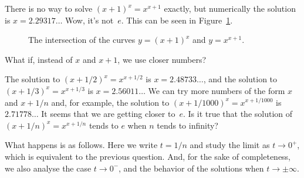 \documentclass[11pt, a4paper]{article}
\begin{document}
There is no way to solve $(x+1)^x = x^{x+1}$ exactly, but numerically the solution is $x = 2.29317\dots$ Wow, it's not~$e$.
This can be seen in Figure~\ref{fig1}.
\begin{figure}[ht]
\centering
{}
\caption{The intersection of the curves $y=(x+1)^{x}$ and $y=x^{x+1}$.}
\label{fig1}
\end{figure}

What if, instead of $x$ and $x+1$, we use closer numbers?

The solution to $(x+1/2)^x = x^{x+1/2}$ is $x = 2.48733\dots$,
and the solution to $(x+1/3)^x = x^{x+1/3}$ is $x = 2.56011\dots$
We can try more numbers of the form $x$ and $x+1/n$ and, for example, the solution to $(x+1/1000)^x = x^{x+1/1000}$ is $2.71778\dots$ It seems that we are getting closer to~$e$. Is it true that the solution of $(x+1/n)^x = x^{x+1/n}$ tends to $e$ when $n$ tends to infinity?

What happens is as follows. Here we write $t = 1/n$ and study the limit as $t \to 0^{+}$, which is equivalent to the previous question. And, for the sake of completeness, 
we also analyse the case $t \to 0^{-}$, and the behavior of the solutions when $t \to \pm \infty$.
\end{document}
